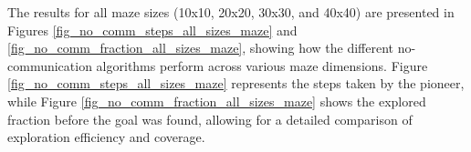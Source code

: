 The results for all maze sizes (10x10, 20x20, 30x30, and 40x40) are presented in Figures \ref{fig_no_comm_steps_all_sizes_maze} and \ref{fig_no_comm_fraction_all_sizes_maze}, showing how the different no-communication algorithms perform across various maze dimensions. Figure \ref{fig_no_comm_steps_all_sizes_maze} represents the steps taken by the pioneer, while Figure \ref{fig_no_comm_fraction_all_sizes_maze} shows the explored fraction before the goal was found, allowing for a detailed comparison of exploration efficiency and coverage.

\begin{figure}[H]
    \centering
    \qquad
    \qquad
    \newline
    \qquad
    \newline

\end{figure}
